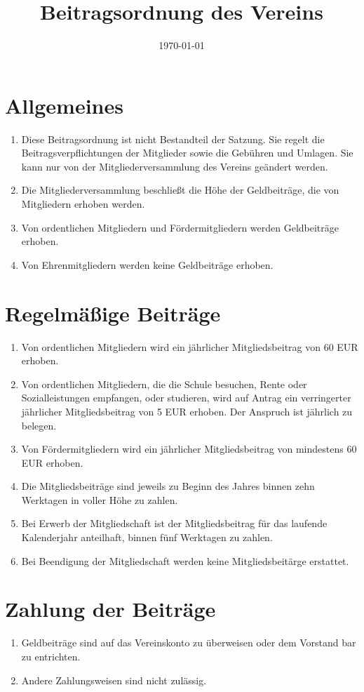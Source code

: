 \documentclass[12pt,a4paper,draft]{article}
\title{Beitragsordnung des Vereins \unsername}
\author{\unsername}
\date{\today}
\begin{document}
\maketitle
\tableofcontents

\section{Allgemeines}
\begin{enumerate}
\item Diese Beitragsordnung ist nicht Bestandteil der Satzung. Sie regelt die 
Beitragsverpflichtungen der Mitglieder sowie die Gebühren und Umlagen. Sie kann 
nur von der Mitgliederversammlung des Vereins geändert werden.

\item Die Mitgliederversammlung beschließt die Höhe der Geldbeiträge, die von 
Mitgliedern erhoben werden.

\item Von ordentlichen Mitgliedern und Fördermitgliedern werden Geldbeiträge 
erhoben.

\item Von Ehrenmitgliedern werden keine Geldbeiträge erhoben.
\end{enumerate}

\section{Regelmäßige Beiträge}
\begin{enumerate}
\item Von ordentlichen Mitgliedern wird ein jährlicher Mitgliedsbeitrag von 60 
EUR erhoben.

\item Von ordentlichen Mitgliedern, die die Schule besuchen, Rente oder 
Sozialleistungen empfangen, oder studieren, wird auf Antrag ein verringerter 
jährlicher Mitgliedsbeitrag von 5 EUR erhoben. Der Anspruch ist jährlich zu 
belegen.

\item Von Fördermitgliedern wird ein jährlicher Mitgliedsbeitrag von mindestens 
60 EUR erhoben.

\item Die Mitgliedsbeiträge sind jeweils zu Beginn des Jahres binnen zehn 
Werktagen in voller Höhe zu zahlen.

\item Bei Erwerb der Mitgliedschaft ist der Mitgliedsbeitrag für das laufende 
Kalenderjahr anteilhaft, binnen fünf Werktagen zu zahlen.

\item Bei Beendigung der Mitgliedschaft werden keine Mitgliedsbeitärge erstattet.
\end{enumerate}

\section{Zahlung der Beiträge}
\begin{enumerate}
\item Geldbeiträge sind auf das Vereinskonto zu überweisen oder dem Vorstand 
bar zu entrichten.

\item Andere Zahlungsweisen sind nicht zulässig.
\end{enumerate}
\end{document}
